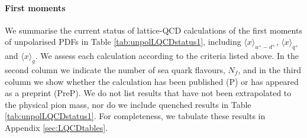 \paragraph{First moments}
We summarise the current status of lattice-QCD calculations of the first moments of unpolarised PDFs
in Table \ref{tab:unpolLQCDstatus1}, including $\langle x\rangle_{u^+-d^+}$, $\langle x\rangle_{q^+}$ and
$\langle x\rangle_{g}$. We assess each calculation according 
to the criteria listed above. In the second column we indicate the number of sea quark flavours, $N_f$, and
in the third column we show whether the calculation has been published (P) or has appeared as a preprint (PreP).
We do not list results that have not been extrapolated to the physical pion mass, nor do we include 
quenched results in Table \ref{tab:unpolLQCDstatus1}. For completeness, we tabulate these results in Appendix 
\ref{sec:LQCDtables}.
